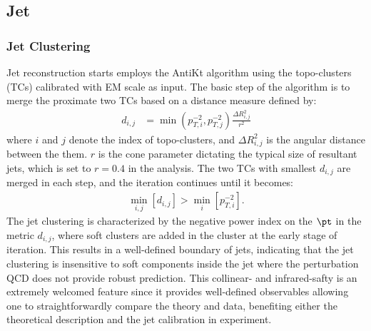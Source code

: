 


\subsection{Jet} \label{sec::objDef::jets}

\subsubsection{Jet Clustering} \label{sec::objDef::jets::clustering}
Jet reconstruction starts employs the AntiKt algorithm \cite{141_antiKt} using the topo-clusters (TCs) calibrated with EM scale as input.
The basic step of the algorithm is to merge the proximate two TCs based on a distance measure defined by:
\begin{align}
d_{i,j} & = \min(p_{T,i}^{-2},p_{T,j}^{-2}) \frac{\Delta R^2_{i,j}}{r^2} 
\end{align}
where $i$ and $j$ denote the index of topo-clusters, and $\Delta R^2_{i,j}$ is the angular distance between the them.
$r$ is the cone parameter dictating the typical size of resultant jets, which is set to $r=0.4$ in the analysis.
The two TCs with smallest $d_{i,j}$ are merged in each step, and the iteration continues until it becomes:
\begin{align}
\min_{i,j} \left[ d_{i,j} \right] > \min_{i} \left[ p_{T,i}^{-2} \right].
\end{align}
The \antikt jet clustering is characterized by the negative power index on the $\pt$ in the metric $d_{i,j}$, 
where soft clusters are added in the cluster at the early stage of iteration.
This results in a well-defined boundary of jets, indicating that the jet clustering is insensitive to soft components inside the jet where the perturbation QCD does not provide robust prediction. This collinear- and infrared-safty is an extremely welcomed feature since it provides well-defined observables allowing one to straightforwardly compare the theory and data, benefiting either the theoretical description and the jet calibration in experiment.


